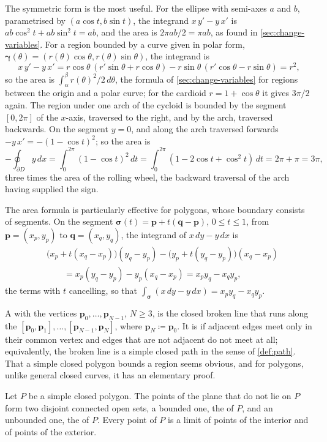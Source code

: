 The symmetric form is the most useful. For the ellipse with semi-axes $a$ and $b$, parametrised by $(a\cos t,b\sin t)$, the integrand $x\,y'-y\,x'$ is $ab\cos^2t+ab\sin^2t=ab$, and the area is $2\pi ab/2=\pi ab$, as found in \cref{sec:change-variables}. For a region bounded by a curve given in polar form, $\boldsymbol\gamma(\theta)=(r(\theta)\cos\theta,r(\theta)\sin\theta)$, the integrand is
\[
x\,y'-y\,x'=r\cos\theta\,(r'\sin\theta+r\cos\theta)-r\sin\theta\,(r'\cos\theta-r\sin\theta)=r^2 ,
\]
so the area is $\int_\alpha^\beta r(\theta)^2/2\,d\theta$, the formula of \cref{sec:change-variables} for regions between the origin and a polar curve; for the cardioid $r=1+\cos\theta$ it gives $3\pi/2$ again. The region under one arch of the cycloid is bounded by the segment $[0,2\pi]$ of the $x$-axis, traversed to the right, and by the arch, traversed backwards. On the segment $y=0$, and along the arch traversed forwards $-y\,x'=-(1-\cos t)^2$; so the area is
\[
-\oint_{\partial D}y\,dx=\int_0^{2\pi}(1-\cos t)^2\,dt=\int_0^{2\pi}(1-2\cos t+\cos^2t)\,dt=2\pi+\pi=3\pi ,
\]
three times the area of the rolling wheel, the backward traversal of the arch having supplied the sign.

The area formula is particularly effective for polygons, whose boundary consists of segments. On the segment $\boldsymbol\sigma(t)=\mathbf p+t(\mathbf q-\mathbf p)$, $0\le t\le1$, from $\mathbf p=(x_p,y_p)$ to $\mathbf q=(x_q,y_q)$, the integrand of $x\,dy-y\,dx$ is
\[
\begin{aligned}
&\bigl(x_p+t(x_q-x_p)\bigr)(y_q-y_p)-\bigl(y_p+t(y_q-y_p)\bigr)(x_q-x_p)\\
&\qquad=x_p(y_q-y_p)-y_p(x_q-x_p)=x_py_q-x_qy_p ,
\end{aligned}
\]
the terms with $t$ cancelling, so that $\int_{\boldsymbol\sigma}(x\,dy-y\,dx)=x_py_q-x_qy_p$.

A  with the vertices $\mathbf p_0,\ldots,\mathbf p_{N-1}$, $N\ge3$, is the closed broken line that runs along the  $[\mathbf p_0,\mathbf p_1],\ldots,[\mathbf p_{N-1},\mathbf p_N]$, where $\mathbf p_N\coloneqq\mathbf p_0$. It is  if adjacent edges meet only in their common vertex and edges that are not adjacent do not meet at all; equivalently, the broken line is a simple closed path in the sense of \cref{def:path}. That a simple closed polygon bounds a region seems obvious, and for polygons, unlike general closed curves, it has an elementary proof.

\begin{theorem}
\label{thm:jordan-polygon}
Let $P$ be a simple closed polygon. The points of the plane that do not lie on $P$ form two disjoint connected open sets, a bounded one, the  of $P$, and an unbounded one, the  of $P$. Every point of $P$ is a limit of points of the interior and of points of the exterior.
\end{theorem}

